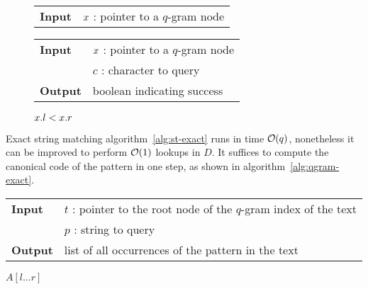 \begin{figure*}
\begin{minipage}[t]{.5\textwidth}
\begin{algorithm}[H]
\begin{tabular}{ll}
\textbf{Input}  & $x$ : pointer to a $q$-gram node\\
\end{tabular}
\begin{algorithmic}[1]
\end{algorithmic}
\label{alg:qgram-goroot}
\end{algorithm}
\end{minipage}
\hfill
\begin{minipage}[t]{.5\textwidth}
\begin{algorithm}[H]
\begin{tabular}{ll}
\textbf{Input}  & $x$ : pointer to a $q$-gram node\\
				& $c$ : character to query\\
\textbf{Output} & boolean indicating success\\
\end{tabular}
\begin{algorithmic}[1]
	\State \Return \False
\EndIf
{}
\State \Return $x.l < x.r$
\end{algorithmic}
\label{alg:qgram-godownc}
\end{algorithm}
\end{minipage}
\end{figure*}

Exact string matching algorithm~\ref{alg:st-exact} runs in time $\mathcal{O}(q)$, nonetheless it can be improved to perform $\mathcal{O}(1)$ lookups in $D$.
It suffices to compute the canonical code of the pattern in one step, as shown in algorithm~\ref{alg:qgram-exact}.

\begin{center}
\begin{minipage}[t]{.8\textwidth}
\begin{algorithm}[H]
\begin{tabular}{ll}
\textbf{Input}  & $t$ : pointer to the root node of the $q$-gram index of the text\\
				& $p$ : string to query\\
\textbf{Output} & list of all occurrences of the pattern in the text\\
\end{tabular}
\begin{algorithmic}[1]
\State \Report $A[l \dots r]$
\end{algorithmic}
\label{alg:qgram-exact}
\end{algorithm}
\end{minipage}
\end{center}

